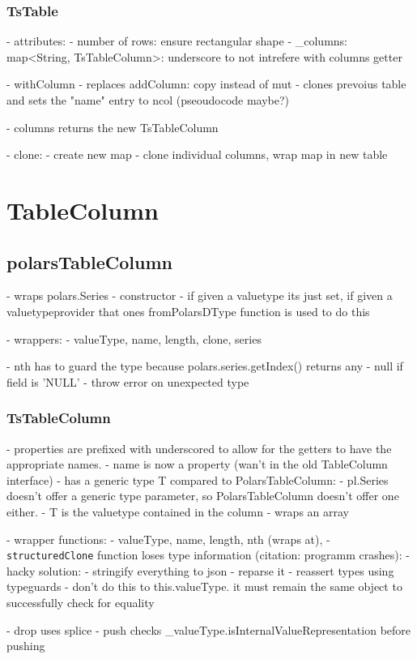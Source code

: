\subsubsection{TsTable}
- attributes:
- number of rows: ensure rectangular shape
- \_columns: map<String, TsTableColumn>: underscore to not intrefere with columns getter

- withColumn
- replaces addColumn: copy instead of mut
- clones prevoius table and sets the "name" entry to ncol (pseoudocode maybe?)

- columns returns the new TsTableColumn

- clone:
- create new map
- clone individual columns, wrap map in new table


\section{TableColumn}
\subsection{polarsTableColumn}
- wraps polars.Series
- constructor
- if given a valuetype its just set, if given a valuetypeprovider that ones fromPolarsDType function is used to do this

- wrappers:
- valueType, name, length, clone, series

- nth has to guard the type because polars.series.getIndex() returns any
- null if field is 'NULL'
- throw error on unexpected type


\subsubsection{TsTableColumn}
- properties are prefixed with underscored to allow for the getters to have the appropriate names.
- name is now a property (wan't in the old TableColumn interface)
- has a generic type T compared to PolarsTableColumn:
- pl.Series doesn't offer a generic type parameter, so PolarsTableColumn doesn't offer one either.
- T is the valuetype contained in the column
- wraps an array

- wrapper functions:
- valueType, name, length, nth (wraps at),
- \Verb|structuredClone| function loses type information (citation: programm crashes):
- hacky solution:
- stringify everything to json
- reparse it
- reassert types using typeguards
- don't do this to this.valueType. it must remain the same object to successfully check for equality

- drop uses splice
- push checks \_valueType.isInternalValueRepresentation before pushing

